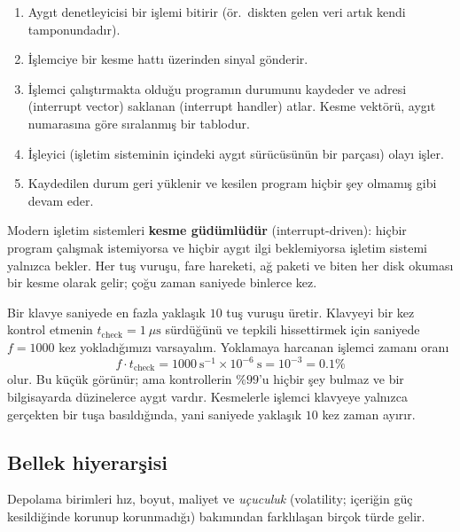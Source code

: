 \begin{enumerate}[leftmargin=1.4em]
  \item Aygıt denetleyicisi bir işlemi bitirir (ör.\ diskten gelen veri artık kendi tamponundadır).
  \item İşlemciye bir kesme hattı üzerinden sinyal gönderir.
  \item İşlemci çalıştırmakta olduğu programın durumunu kaydeder ve adresi  (interrupt vector) saklanan  (interrupt handler) atlar. Kesme vektörü, aygıt numarasına göre sıralanmış bir tablodur.
  \item İşleyici (işletim sisteminin içindeki aygıt sürücüsünün bir parçası) olayı işler.
  \item Kaydedilen durum geri yüklenir ve kesilen program hiçbir şey olmamış gibi devam eder.
\end{enumerate}

Modern işletim sistemleri \textbf{kesme güdümlüdür} (interrupt-driven): hiçbir program çalışmak istemiyorsa ve hiçbir aygıt ilgi beklemiyorsa işletim sistemi yalnızca bekler. Her tuş vuruşu, fare hareketi, ağ paketi ve biten her disk okuması bir kesme olarak gelir; çoğu zaman saniyede binlerce kez.

\begin{example}
Bir klavye saniyede en fazla yaklaşık $10$ tuş vuruşu üretir. Klavyeyi bir kez kontrol etmenin $t_{\text{check}} = 1\ \mu\text{s}$ sürdüğünü ve tepkili hissettirmek için saniyede $f = 1000$ kez yokladığımızı varsayalım. Yoklamaya harcanan işlemci zamanı oranı
\[
f \cdot t_{\text{check}} = 1000\ \text{s}^{-1} \times 10^{-6}\ \text{s} = 10^{-3} = 0.1\%
\]
olur. Bu küçük görünür; ama kontrollerin $\%99$'u hiçbir şey bulmaz ve bir bilgisayarda düzinelerce aygıt vardır. Kesmelerle işlemci klavyeye yalnızca gerçekten bir tuşa basıldığında, yani saniyede yaklaşık $10$ kez zaman ayırır.
\end{example}

\subsection{Bellek hiyerarşisi}

Depolama birimleri hız, boyut, maliyet ve \emph{uçuculuk} (volatility; içeriğin güç kesildiğinde korunup korunmadığı) bakımından farklılaşan birçok türde gelir.

